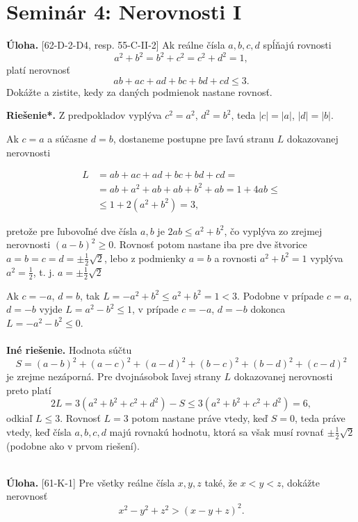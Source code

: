 \documentclass[11pt,a4paper,oneside,final]{book}
\newcommand{\ul}{\textbf{Úloha.} }
\newcommand{\rieh}{\textbf{Riešenie*.} }
\begin{document}
\section*{Seminár 4: Nerovnosti I}
\begin{tcolorbox}[breakable,notitle,boxrule=0pt,colback=light-gray,colframe=light-gray]\ul [62-D-2-D4, resp. 55-C-II-2] Ak reálne čísla $a, b, c, d$ spĺňajú rovnosti $$a^2+ b^2= b^2+ c^2= c^2+ d^2= 1,$$
platí nerovnosť
$$ab + ac + ad + bc + bd + cd \leq 3.$$
Dokážte a zistite, kedy za daných podmienok nastane rovnosť.

\end{tcolorbox}

\rieh Z predpokladov vyplýva $c^2 = a^2$, $d^2= b^2$, teda $|c| = |a|$, $|d| = |b|$.

Ak $c = a$ a súčasne $d = b$, dostaneme postupne pre ľavú stranu $L$ dokazovanej
nerovnosti
\vspace{-25pt}
\begin{center}
\begin{align*}
L &= ab + ac + ad + bc + bd + cd =\\
 &= ab + a^2 + ab + ab + b^2 + ab = 1 + 4ab \leq \\
&\leq 1 + 2(a^2 + b^2 ) = 3,
\end{align*}
\end{center}
pretože pre ľubovoľné dve čísla $a, b$ je $2ab \leq a^2 + b^2$, čo vyplýva zo zrejmej nerovnosti $(a -b)^2 \geq 0$. Rovnosť potom nastane iba pre dve štvorice $a = b = c = d =\pm\frac{1}{2}\sqrt{2}$, lebo z podmienky $a = b$ a rovnosti $a^2 + b^2 = 1$ vyplýva $a^2 =\frac{1}{2}$, t. j. $a = \pm \frac{1}{2}\sqrt{2}$

Ak $c = -a$, $d = b$, tak $L = -a^2 + b^2 \leq a^2 + b^2 = 1 < 3$. Podobne v prípade $c = a$,
$d = -b$ vyjde $L = a^2 - b^2 \leq 1$, v prípade $c = -a$, $d = -b$ dokonca $L = -a^2 - b^2 \leq 0$.\\
\\
\textbf{Iné riešenie.} Hodnota súčtu
$$S = (a - b)^2 + (a - c)^2 + (a - d)^2 + (b - c)^2 + (b - d)^2 + (c - d)^2$$
je zrejme nezáporná. Pre dvojnásobok ľavej strany $L$ dokazovanej nerovnosti preto platí
$$2L = 3(a^2 + b^2 + c^2 + d^2 ) - S \leq 3(a^2 + b^2 + c^2 + d^2 ) = 6,$$
odkiaľ $L \leq 3$. Rovnosť $L = 3$ potom nastane práve vtedy, keď $S = 0$, teda práve vtedy, keď čísla $a, b, c, d$ majú rovnakú hodnotu, ktorá sa však musí rovnať $\pm \frac{1}{2}\sqrt{2}$ (podobne ako v prvom riešení).\\
\\
\begin{tcolorbox}[breakable,notitle,boxrule=0pt,colback=light-gray,colframe=light-gray]\ul [61-K-1]
Pre všetky reálne čísla $x, y, z$ také, že $x < y < z$, dokážte nerovnosť $$x^2 - y^2
+ z^2> (x - y + z)^2.$$

\end{tcolorbox}
\end{document}

